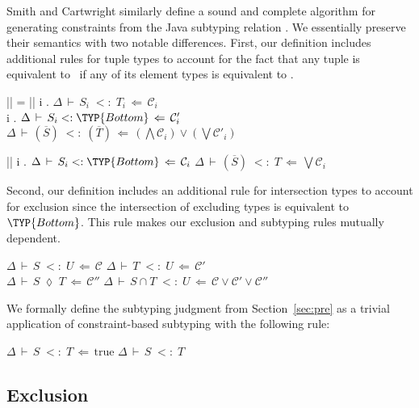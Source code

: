 \documentclass[10pt]{sigplanconf}
\renewcommand{\bar}{\overline}
\newcommand{\C}{\mathcal{C}}
\newcommand{\exc}{\mathrel{\lozenge}}
\newcommand{\subtypeof}{\ensuremath{<:}}
\newcommand{\Bottom}{\TYP{Bottom}}
\newcommand{\TRUE}{\textrm{true}}
\newcommand{\jgtemplate}[4][\Delta]{\ensuremath{{#1}\,\vdash\,{#2}\;{#3}\;{#4}}}
\newcommand{\jgsub}[3][\Delta]{\jgtemplate[#1]{#2}{\subtypeof}{#3}}
\newcommand{\jgconstrtemplate}[5][\Delta]{\ensuremath{{#1}\,\vdash\,{#2}\;{#3}\;{#4}\,\Leftarrow\,{#5}}}
\newcommand{\jsub}[4][\Delta]{\jgconstrtemplate[#1]{#2}{\subtypeof}{#3}{#4}}
\newcommand{\jexc}[4][\Delta]{\jgconstrtemplate[#1]{#2}{\exc}{#3}{#4}}
\begin{document}
Smith and Cartwright similarly define a sound and complete algorithm 
for generating constraints from the Java subtyping relation \cite{smith08}. 
We essentially preserve their semantics with two notable differences. 
First, our definition includes additional rules for tuple types 
to account for the fact that 
any tuple is equivalent to \Bottom\ 
if any of its element types is equivalent to \Bottom.

\infrule
  {|\bar{S}| = |\bar{T}| \andalso \forall  i . \quad \jsub{S_i}{T_i}{\C_i} \\
   \forall i . \quad \jsub{S_i}{\Bottom}{\C'_i}}
  {\jsub{(\bar{S})}{(\bar{T})}{(\bigwedge \C_i) \vee (\bigvee \C'_i)}}

\infrule
  {|\bar{S}|  \andalso \forall i . \quad \jsub{S_i}{\Bottom}{\C_i}}
  {\jsub{(\bar{S})}{T}{\bigvee \C_i}}

\noindent Second, our definition includes an additional rule for intersection types to account for
exclusion since the intersection of excluding types is equivalent to
$\Bottom$. 
This rule makes our exclusion and subtyping rules mutually dependent.

\infrule
  {\jsub{S}{U}{\C} \andalso \jsub{T}{U}{\C'} \\
   \jexc{S}{T}{\C''}}
  {\jsub{S \cap T}{U}{\C \vee \C' \vee \C''}}
  
We formally define the subtyping judgment from Section~\ref{sec:pre} as a trivial application of
constraint-based subtyping with the following rule:

\infrule
  {\jsub{S}{T}{\TRUE}}
  {\jgsub{S}{T}}


\subsection{Exclusion}
\end{document}
